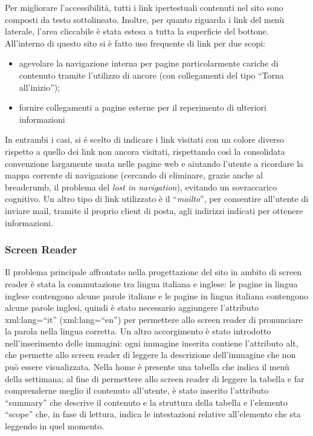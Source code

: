 \documentclass[10pt,a4paper,onecolumn]{article}
\begin{document}
Per migliorare l’accessibilità, tutti i link ipertestuali contenuti nel sito sono composti da testo sottolineato. Inoltre, per quanto riguarda i link del menù laterale, l’area cliccabile è stata estesa a tutta la superficie del bottone.
All’interno di questo sito si è fatto uso frequente di link per due scopi:
\begin{itemize}
 \item agevolare la navigazione interna per pagine particolarmente cariche di contenuto tramite l’utilizzo di ancore (con collegamenti del tipo ``Torna all’inizio'');
 \item fornire collegamenti a pagine esterne per il reperimento di ulteriori informazioni
\end{itemize}
In entrambi i casi, si é scelto di indicare i link visitati con un colore diverso rispetto a quello dei link non ancora visitati, rispettando così la consolidata convenzione largamente usata nelle pagine web e aiutando l’utente a ricordare la mappa corrente di navigazione (cercando di eliminare, grazie anche al breadcrumb, il problema del \textit{lost in navigation}), evitando un sovraccarico cognitivo. Un altro tipo di link utilizzato è il ``\textit{mailto}'', per consentire all’utente di inviare mail, tramite il proprio client di posta, agli indirizzi indicati per ottenere informazioni. 

\subsubsection{Screen Reader}

Il problema principale affrontato nella progettazione del sito in ambito di screen reader è stata la commutazione tra lingua italiana e inglese: le pagine in lingua inglese contengono alcune parole italiane e le pagine in lingua italiana contengono alcune parole inglesi, quindi è stato necessario aggiungere l’attributo xml:lang=``it'' (xml:lang=``en'') per permettere allo screen reader di pronunciare la parola nella lingua corretta.
Un altro accorgimento è stato introdotto nell'inserimento delle immagini: ogni immagine inserita contiene l'attributo alt, che permette allo screen reader di leggere la descrizione dell'immagine che non può essere visualizzata.
Nella home è presente una tabella che indica il menù della settimana; al fine di permettere allo screen reader di leggere la tabella e far comprenderne meglio il contenuto all'utente, è stato inserito l'attributo ``summary'' che descrive il contenuto e la struttura della tabella e l'elemento ``scope'' che, in fase di lettura, indica le intestazioni relative all'elemento che sta leggendo in quel momento.
\end{document}

